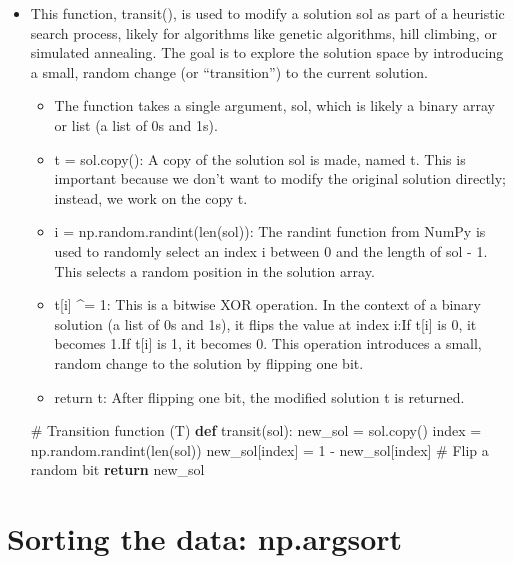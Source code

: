 \documentclass[
  letterpaper,
  DIV=11,
  numbers=noendperiod]{scrreprt}
\newenvironment{Shaded}{\begin{snugshade}}{\end{snugshade}}
\newcommand{\BuiltInTok}[1]{\textcolor[rgb]{0.00,0.23,0.31}{#1}}
\newcommand{\CommentTok}[1]{\textcolor[rgb]{0.37,0.37,0.37}{#1}}
\newcommand{\ControlFlowTok}[1]{\textcolor[rgb]{0.00,0.23,0.31}{\textbf{#1}}}
\newcommand{\DecValTok}[1]{\textcolor[rgb]{0.68,0.00,0.00}{#1}}
\newcommand{\KeywordTok}[1]{\textcolor[rgb]{0.00,0.23,0.31}{\textbf{#1}}}
\newcommand{\NormalTok}[1]{\textcolor[rgb]{0.00,0.23,0.31}{#1}}
\newcommand{\OperatorTok}[1]{\textcolor[rgb]{0.37,0.37,0.37}{#1}}
\providecommand{\tightlist}{%
  \setlength{\itemsep}{0pt}\setlength{\parskip}{0pt}}\usepackage{longtable,booktabs,array}
\begin{document}
\begin{itemize}
\item
  This function, transit(), is used to modify a solution sol as part of
  a heuristic search process, likely for algorithms like genetic
  algorithms, hill climbing, or simulated annealing. The goal is to
  explore the solution space by introducing a small, random change (or
  ``transition'') to the current solution.

  \begin{itemize}
  \tightlist
  \item
    The function takes a single argument, sol, which is likely a binary
    array or list (a list of 0s and 1s).
  \item
    t = sol.copy(): A copy of the solution sol is made, named t. This is
    important because we don't want to modify the original solution
    directly; instead, we work on the copy t.
  \item
    i = np.random.randint(len(sol)): The randint function from NumPy is
    used to randomly select an index i between 0 and the length of sol -
    1. This selects a random position in the solution array.
  \item
    t{[}i{]} \^{}= 1: This is a bitwise XOR operation. In the context of
    a binary solution (a list of 0s and 1s), it flips the value at index
    i:If t{[}i{]} is 0, it becomes 1.If t{[}i{]} is 1, it becomes 0.
    This operation introduces a small, random change to the solution by
    flipping one bit.
  \item
    return t: After flipping one bit, the modified solution t is
    returned.
  \end{itemize}

\begin{Shaded}
\begin{Highlighting}[]
\CommentTok{\# Transition function (T)}
\KeywordTok{def}\NormalTok{ transit(sol):}
\NormalTok{    new\_sol }\OperatorTok{=}\NormalTok{ sol.copy()}
\NormalTok{    index }\OperatorTok{=}\NormalTok{ np.random.randint(}\BuiltInTok{len}\NormalTok{(sol))}
\NormalTok{    new\_sol[index] }\OperatorTok{=} \DecValTok{1} \OperatorTok{{-}}\NormalTok{ new\_sol[index]  }\CommentTok{\# Flip a random bit}
    \ControlFlowTok{return}\NormalTok{ new\_sol}
\end{Highlighting}
\end{Shaded}
\end{itemize}

\section{Sorting the data:
np.argsort}\label{sorting-the-data-np.argsort}
\end{document}
